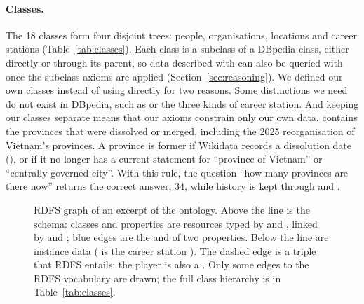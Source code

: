 \paragraph{Classes.} The 18 classes form four disjoint trees: people, organisations,
locations and career stations (Table~\ref{tab:classes}). Each class is a subclass of
a DBpedia class, either directly or through its parent, so data described
with  can also be queried with  once the
subclass axioms are applied (Section~\ref{sec:reasoning}). We defined our own classes instead of
using  directly for two reasons. Some distinctions we need do not
exist in DBpedia, such as  or the three kinds of
career station. And keeping our classes separate means that our axioms
constrain only our own data.  contains the provinces
that were dissolved or merged, including the 2025 reorganisation of Vietnam's
provinces. A province is former if Wikidata records a dissolution date
(), or if it no longer has a current  statement for
``province of Vietnam'' or ``centrally governed city''. With this rule, the
question ``how many provinces are there now'' returns the correct answer, 34,
while history is kept through  and .

\begin{figure}[t]
\centering
\resizebox{\textwidth}{!}{}
\caption{RDFS graph of an excerpt of the ontology. Above the line is the
schema: classes and properties are resources typed by  and
, linked by  and
; blue edges are the  and
 of two properties. Below the line are instance data
( is the career station ).
The dashed edge is a triple that RDFS entails: the player is also a
. Only some  edges to the RDFS vocabulary are
drawn; the full class hierarchy is in Table~\ref{tab:classes}.}
\label{fig:rdfs}
\end{figure}

